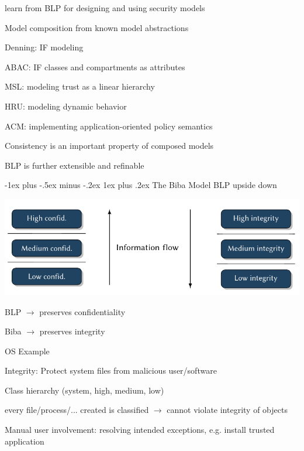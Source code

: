 \documentclass[a4paper]{article}
\makeatletter
\renewcommand{\subsubsection}{\@startsection{subsubsection}{3}{0mm}%
                                {-1ex plus -.5ex minus -.2ex}%
                                {1ex plus .2ex}%
                                {\normalfont\small\bfseries}}
\makeatother
\begin{document}
\begin{multicols}{3}
    learn from BLP for designing and using security models
    \begin{itemize*}
        \item Model composition from known model abstractions
        \begin{itemize*}
            \item Denning: IF modeling
            \item ABAC: IF classes and compartments as attributes
            \item MSL: modeling trust as a linear hierarchy
            \item HRU: modeling dynamic behavior
            \item ACM: implementing application-oriented policy semantics
        \end{itemize*}
        \item Consistency is an important property of composed models
        \item BLP is further extensible and refinable
    \end{itemize*}

    \subsubsection{The Biba Model}
    BLP upside down

    \begin{center}
        \includegraphics[width=.5\linewidth]{Assets/Systemsicherheit-blp-vs-biba.png}
    \end{center}
    \begin{itemize*}
        \item BLP $\rightarrow$ preserves confidentiality
        \item Biba $\rightarrow$ preserves integrity
    \end{itemize*}

    OS Example
    \begin{itemize*}
        \item Integrity: Protect system files from malicious user/software
        \item Class hierarchy (system, high, medium, low)
        \item every file/process/... created is classified $\rightarrow$ cannot violate integrity of objects
        \item Manual user involvement: resolving intended exceptions, e.g. install trusted application
    \end{itemize*}



\end{multicols}
\end{document}
